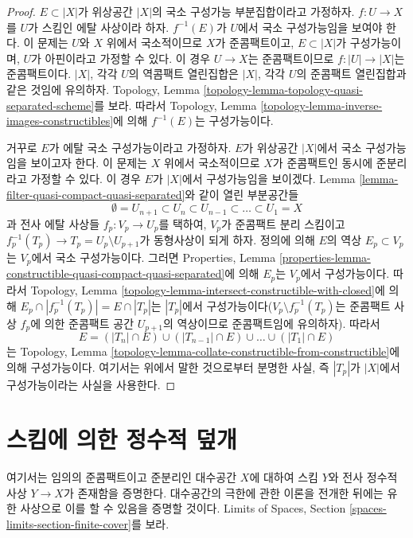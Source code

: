 \begin{proof}
$E \subset |X|$가 위상공간 $|X|$의 국소 구성가능 부분집합이라고
가정하자. $f : U \to X$를 $U$가 스킴인 에탈 사상이라 하자.
$f^{-1}(E)$가 $U$에서 국소 구성가능임을 보여야 한다.
이 문제는 $U$와 $X$ 위에서 국소적이므로 $X$가 준콤팩트이고,
$E \subset |X|$가 구성가능이며, $U$가 아핀이라고 가정할 수 있다.
이 경우 $U \to X$는 준콤팩트이므로
$f : |U| \to |X|$는 준콤팩트이다. $|X|$, 각각 $U$의 역콤팩트
열린집합은 $|X|$, 각각 $U$의 준콤팩트 열린집합과 같은 것임에
유의하자. Topology, Lemma
\ref{topology-lemma-topology-quasi-separated-scheme}를 보라.
따라서 Topology, Lemma
\ref{topology-lemma-inverse-images-constructibles}에 의해
$f^{-1}(E)$는 구성가능이다.

\medskip\noindent
거꾸로 $E$가 에탈 국소 구성가능이라고 가정하자.
$E$가 위상공간 $|X|$에서 국소 구성가능임을 보이고자 한다.
이 문제는 $X$ 위에서 국소적이므로 $X$가 준콤팩트인 동시에
준분리라고 가정할 수 있다. 이 경우 $E$가 $|X|$에서 구성가능임을
보이겠다. Lemma
\ref{lemma-filter-quasi-compact-quasi-separated}와 같이 열린 부분공간들
$$
\emptyset = U_{n + 1} \subset
U_n \subset U_{n - 1} \subset \ldots \subset U_1 = X
$$
과 전사 에탈 사상들 $f_p : V_p \to U_p$를 택하여, $V_p$가
준콤팩트 분리 스킴이고
$f_p^{-1}(T_p) \to T_p = U_p \setminus U_{p + 1}$가 동형사상이
되게 하자. 정의에 의해 $E$의 역상 $E_p \subset V_p$는 $V_p$에서
국소 구성가능이다. 그러면 Properties, Lemma
\ref{properties-lemma-constructible-quasi-compact-quasi-separated}에
의해 $E_p$는 $V_p$에서 구성가능이다. 따라서 Topology, Lemma
\ref{topology-lemma-intersect-constructible-with-closed}에 의해
$E_p \cap |f_p^{-1}(T_p)| = E \cap |T_p|$는 $|T_p|$에서
구성가능이다($V_p \setminus f_p^{-1}(T_p)$는 준콤팩트 사상
$f_p$에 의한 준콤팩트 공간 $U_{p + 1}$의 역상이므로 준콤팩트임에
유의하자). 따라서
$$
E = (|T_n| \cap E) \cup (|T_{n - 1}| \cap E) \cup \ldots \cup
(|T_1| \cap E)
$$
는 Topology, Lemma
\ref{topology-lemma-collate-constructible-from-constructible}에 의해
구성가능이다. 여기서는 위에서 말한 것으로부터 분명한 사실, 즉
$|T_p|$가 $|X|$에서 구성가능이라는 사실을 사용한다.
\end{proof}


\section{스킴에 의한 정수적 덮개}
\label{section-integral-cover}

\noindent
여기서는 임의의 준콤팩트이고 준분리인 대수공간 $X$에 대하여
스킴 $Y$와 전사 정수적 사상 $Y \to X$가 존재함을 증명한다.
대수공간의 극한에 관한 이론을 전개한 뒤에는 유한 사상으로 이를
할 수 있음을 증명할 것이다. Limits of Spaces, Section
\ref{spaces-limits-section-finite-cover}를 보라.

